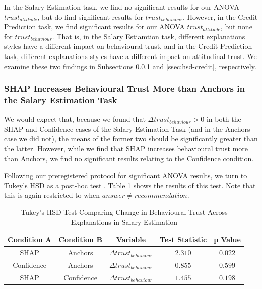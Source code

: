 In the Salary Estimation task, we find no significant results for our ANOVA $trust_{attitude}$, but do find significant results for $trust_{behaviour}$. However, in the Credit Prediction task, we find significant results for our ANOVA $trust_{attitude}$, but none for $trust_{behaviour}$. That is, in the Salary Estiamtion task, different explanations styles have a different impact on behavioural trust, and in the Credit Prediction task, different explanations styles have a different impact on attitudinal trust. We examine these two findings in Subsections \ref{ssec:hsd-salary} and \ref{ssec:hsd-credit}, respectively.

\subsubsection{SHAP Increases Behavioural Trust More than Anchors in the Salary Estimation Task}\label{ssec:hsd-salary}
We would expect that, because we found that $\Delta trust_{behaviour} > 0$ in both the SHAP and Confidence cases of the Salary Estimation Task (and in the Anchors case we did not), the means of the former two should be significantly greater than the latter. However, while we find that SHAP increases behavioural trust more than Anchors, we find no significant results relating to the Confidence condition.

Following our preregistered protocol for significant ANOVA results, we turn to Tukey's HSD as a post-hoc test \cite{natarajan_binns_2022}. Table \ref{tab:delta-trust-hsd} shows the results of this test. Note that this is again restricted to when $answer \neq recommendation$.

\begin{table}[htbp]
    \caption{Tukey's HSD Test Comparing Change in Behavioural Trust Across Explanations in Salary Estimation}
    \begin{center}
    \begin{tabular}{ccccc}
        \toprule
        Condition A & Condition B & Variable & Test Statistic & p Value \\
        \midrule
        SHAP & Anchors & $\Delta trust_{behaviour}$ & $\mathbf{2.310}$ & $\mathbf{0.022}$ \\
        Confidence & Anchors & $\Delta trust_{behaviour}$ & $0.855$ & $0.599$ \\
        SHAP & Confidence & $\Delta trust_{behaviour}$ & $1.455$ & $0.198$ \\
        \bottomrule
    \end{tabular}
    \label{tab:delta-trust-hsd}
    \end{center}
\end{table}

